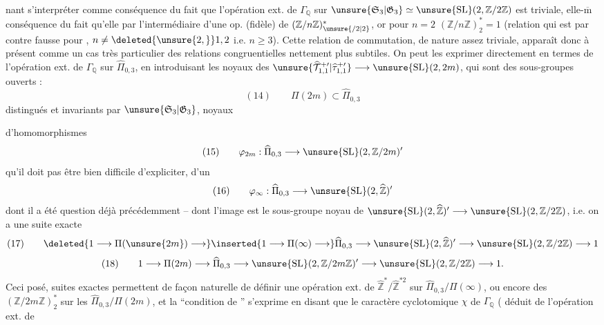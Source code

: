 nant s'interpréter comme conséquence du fait que l'opération ext. de $\Gamma_{\mathbb Q}$ sur $\unsure{\mathfrak S_3|\mathfrak G_3}\simeq \unsure{\mathrm{SL}}(2,\mathbb Z/2\mathbb Z)$ est triviale, elle-$\overline{\mathrm m}$  conséquence du fait qu'elle  par l'intermédiaire d'une op. (fidèle) de $(\mathbb Z/n\mathbb Z)^*_{\unsure{/2|2}}$, or pour $n=2$ $(\mathbb Z/n\mathbb Z)^*_2=1$ (relation qui est par contre fausse pour   , $n\neq\deleted{\unsure{2,}}1,2$ i.e. $n\geq3$). Cette relation de commutation, de nature assez triviale, apparaît donc à présent comme un cas très particulier des relations congruentielles nettement plus subtiles. On peut  les exprimer   directement en termes de l'opération ext. de $\Gamma_{\mathbb Q}$ sur $\widehat\Pi_{0,3}$, en introduisant les noyaux des  $\unsure{\widehat{\mathcal T}_{1,1}^{+\prime}|\widehat\tau_{1,1}^{+\prime}}\longrightarrow \unsure{\mathrm{SL}}(2,2m)$, qui sont des sous-groupes  ouverts :
\[
(14)\qquad \Pi(2m)\subset\widehat\Pi_{0,3}
\]
distingués et invariants par $\unsure{\mathfrak S_3|\mathfrak G_3}$, noyaux

d'homomorphismes
\[
(15)\qquad \varphi_{2m}:\widehat\Pi_{0,3}\longrightarrow\unsure{\mathrm{SL}}(2,\mathbb Z/2m)'
\]
qu'il  doit pas être bien difficile d'expliciter,   d'un 
\[
(16)\qquad \varphi_{\infty}:\widehat\Pi_{0,3}\longrightarrow\unsure{\mathrm{SL}}(2,\widehat{\mathbb Z})'
\]
dont il a été question déjà précédemment --  dont l'image est le sous-groupe noyau de $\unsure{\mathrm{SL}}(2,\widehat{\mathbb Z})'\longrightarrow\unsure{\mathrm{SL}}(2,\mathbb Z/2\mathbb Z)$, i.e. on a une suite exacte
\[
(17)\qquad \deleted{1\longrightarrow\Pi(\unsure{2m})\longrightarrow}\inserted{1\longrightarrow\Pi(\infty)\longrightarrow}\widehat\Pi_{0,3}\longrightarrow\unsure{\mathrm{SL}}(2,\widehat{\mathbb Z})'\longrightarrow\unsure{\mathrm{SL}}(2,\mathbb Z/2\mathbb Z)\longrightarrow1
\]
\[
(18)\qquad 1\longrightarrow\Pi(2m)\longrightarrow\widehat\Pi_{0,3}\longrightarrow\unsure{\mathrm{SL}}(2,\mathbb Z/2m\mathbb Z)'\longrightarrow\unsure{\mathrm{SL}}(2,\mathbb Z/2\mathbb Z)\longrightarrow1.
\]
Ceci posé,  suites exactes permettent de façon naturelle de définir une opération ext. de $\widehat{\mathbb Z}^{*}/\widehat{\mathbb Z}^{*2}$ sur $\widehat\Pi_{0,3}/\Pi(\infty)$, ou encore des $(\mathbb Z/2m\mathbb Z)^*_2$ sur les $\widehat\Pi_{0,3}/\Pi(2m)$, et la ``condition de '' s'exprime en disant que le caractère cyclotomique $\chi$ de $\Gamma_{\mathbb Q}$ ( déduit de l'opération ext. de

